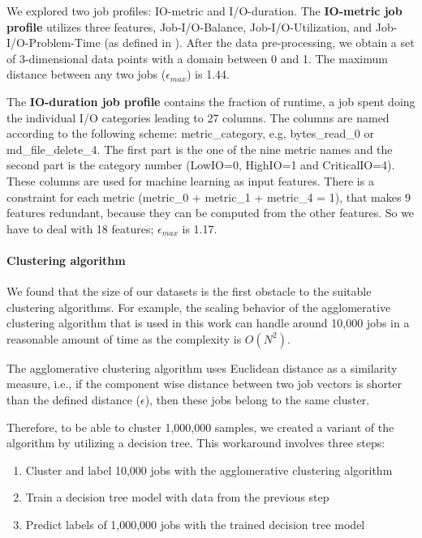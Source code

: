 \documentclass{jhps}
\makeatletter
\newcommand{\jk}[1]{\todo[inline]{JK:\@#1}}
\makeatother
\begin{document}
We explored two job profiles: IO-metric and I/O-duration.
The \textbf{IO-metric job profile} utilizes three features, Job-I/O-Balance, Job-I/O-Utilization, and Job-I/O-Problem-Time (as defined in \cite{iocats2020}).
After the data pre-processing, we obtain a set of 3-dimensional data points with a domain between 0 and 1.
The maximum distance between any two jobs ($\epsilon_{max}$) is 1.44.

The \textbf{IO-duration job profile} contains the fraction of runtime, a job spent doing the individual I/O categories leading to 27 columns.
The columns are named according to the following scheme: metric\_category, e.g, bytes\_read\_0 or md\_file\_delete\_4.
The first part is the one of the nine metric names and the second part is the category number (LowIO=0, HighIO=1 and CriticalIO=4).
These columns are used for machine learning as input features.
There is a constraint for each metric (metric\_0 + metric\_1 + metric\_4 = 1), that makes 9 features redundant, because they can be computed from the other features.
So we have to deal with 18 features; $\epsilon_{max}$ is 1.17.

\paragraph{Clustering algorithm}
We found that the size of our datasets is the first obstacle to the suitable clustering algorithms.
For example, the scaling behavior of the agglomerative clustering algorithm that is used in this work can handle around 10,000 jobs in a reasonable amount of time as the complexity is $O(N^{2})$.

The agglomerative clustering algorithm uses Euclidean distance as a similarity measure, i.e., if the component wise distance between two job vectors is shorter than the defined distance ($\epsilon$), then these jobs belong to the same cluster.

Therefore, to be able to cluster 1,000,000 samples, we created a variant of the algorithm by utilizing a decision tree.
This workaround involves three steps:

\begin{enumerate}
 \item Cluster and label 10,000 jobs with the agglomerative clustering algorithm
 \item Train a decision tree model with data from the previous step
 \item Predict labels of 1,000,000 jobs with the trained decision tree model
\end{enumerate}
\end{document}

